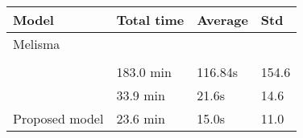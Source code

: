 \begin{tabular}{l|lll}
    Model                        & Total time & Average & Std   \\
    \hline
    Melisma                      &            &         &       \\
    \textcite{chen2021attend}    &            &         &       \\
    \textcite{mcleod2021modular} & 183.0 min  & 116.84s & 154.6 \\
    \textcite{micchi2021deep}    & 33.9 min   & 21.6s   & 14.6  \\
    Proposed model               & 23.6 min   & 15.0s   & 11.0  \\
\end{tabular}
